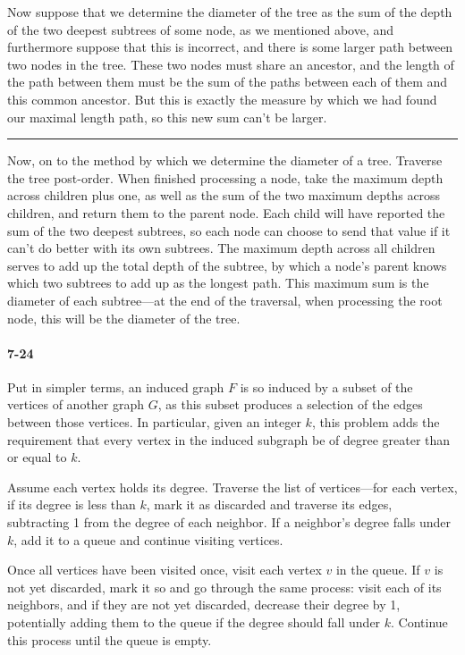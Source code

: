 \documentclass{report}
\newcommand{\okthen}{\rule[-1.4pt]{0.3em}{0.77em}}
\begin{document}
Now suppose that we determine the diameter of the tree as the sum of the depth of the two deepest subtrees of some node, as we mentioned above, and furthermore suppose that this is incorrect, and there is some larger path between two nodes in the tree. These two nodes must share an ancestor, and the length of the path between them must be the sum of the paths between each of them and this common ancestor. But this is exactly the measure by which we had found our maximal length path, so this new sum can't be larger.\ \okthen

\smallskip

Now, on to the method by which we determine the diameter of a tree. Traverse the tree post-order.   When finished processing a node, take the maximum depth across children plus one, as well as the sum of the two maximum depths across children, and return them to the parent node. Each child will have reported the sum of the two deepest subtrees, so each node can choose to send that value if it can't do better with its own subtrees. The maximum depth across all children serves to add up the total depth of the subtree, by which a node's parent knows which two subtrees to add up as the longest path. This maximum sum is the diameter of each subtree---at the end of the traversal, when processing the root node, this will be the diameter of the tree.

\paragraph{7-24} Put in simpler terms, an induced graph $F$ is so induced by a subset of the vertices of another graph $G$, as this subset produces a selection of the edges between those vertices. In particular, given an integer $k$, this problem adds the requirement that every vertex in the induced subgraph be of degree greater than or equal to $k$.

\smallskip

Assume each vertex holds its degree. Traverse the list of vertices---for each vertex, if its degree is less than $k$, mark it as discarded and traverse its edges, subtracting 1 from the degree of each neighbor. If a neighbor's degree falls under $k$, add it to a queue and continue visiting vertices.

Once all vertices have been visited once, visit each vertex $v$ in the queue. If $v$ is not yet discarded, mark it so and go through the same process: visit each of its neighbors, and if they are not yet discarded, decrease their degree by 1, potentially adding them to the queue if the degree should fall under $k$. Continue this process until the queue is empty.
\end{document}
